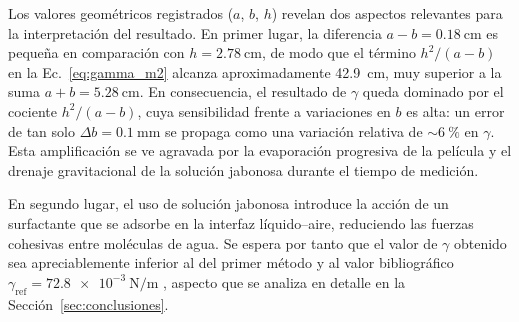 Los valores geométricos registrados ($a$, $b$, $h$) revelan dos aspectos
relevantes para la interpretación del resultado. En primer lugar, la
diferencia $a - b = \qty{0.18}{\centi\meter}$ es pequeña en comparación
con $h = \qty{2.78}{\centi\meter}$, de modo que el término $h^2/(a-b)$
en la Ec.~\eqref{eq:gamma_m2} alcanza aproximadamente
\qty{42.9}{\centi\meter}, muy superior a la suma
$a + b = \qty{5.28}{\centi\meter}$. En consecuencia, el resultado de
$\gamma$ queda dominado por el cociente $h^2/(a-b)$, cuya sensibilidad
frente a variaciones en $b$ es alta: un error de tan solo
$\Delta b = \qty{0.1}{\milli\meter}$ se propaga como una variación
relativa de $\sim\qty{6}{\percent}$ en $\gamma$. Esta amplificación se
ve agravada por la evaporación progresiva de la película y el drenaje
gravitacional de la solución jabonosa durante el tiempo de medición.

En segundo lugar, el uso de solución jabonosa introduce la acción de un
surfactante que se adsorbe en la interfaz líquido--aire, reduciendo las
fuerzas cohesivas entre moléculas de agua. Se espera por tanto que el
valor de $\gamma$ obtenido sea apreciablemente inferior al del primer
método y al valor bibliográfico
$\gamma_{\text{ref}} = \qty{72.8e-3}{\newton\per\meter}$
\cite{serway}, aspecto que se analiza en detalle en la
Sección~\ref{sec:conclusiones}.